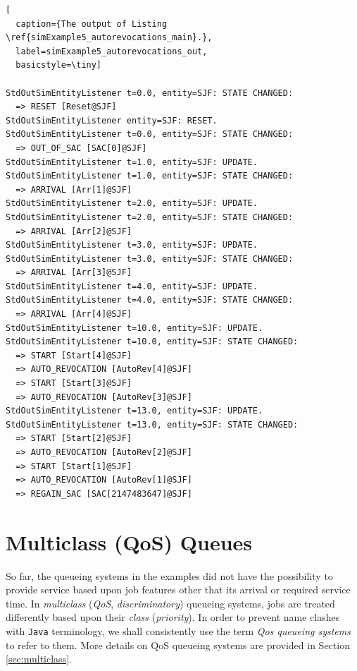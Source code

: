 \documentclass[12pt]{book}
\begin{document}
\begin{lstfloat}  
\begin{lstlisting}[
  caption={The output of Listing \ref{simExample5_autorevocations_main}.},
  label=simExample5_autorevocations_out,
  basicstyle=\tiny]

StdOutSimEntityListener t=0.0, entity=SJF: STATE CHANGED:
  => RESET [Reset@SJF]
StdOutSimEntityListener entity=SJF: RESET.
StdOutSimEntityListener t=0.0, entity=SJF: STATE CHANGED:
  => OUT_OF_SAC [SAC[0]@SJF]
StdOutSimEntityListener t=1.0, entity=SJF: UPDATE.
StdOutSimEntityListener t=1.0, entity=SJF: STATE CHANGED:
  => ARRIVAL [Arr[1]@SJF]
StdOutSimEntityListener t=2.0, entity=SJF: UPDATE.
StdOutSimEntityListener t=2.0, entity=SJF: STATE CHANGED:
  => ARRIVAL [Arr[2]@SJF]
StdOutSimEntityListener t=3.0, entity=SJF: UPDATE.
StdOutSimEntityListener t=3.0, entity=SJF: STATE CHANGED:
  => ARRIVAL [Arr[3]@SJF]
StdOutSimEntityListener t=4.0, entity=SJF: UPDATE.
StdOutSimEntityListener t=4.0, entity=SJF: STATE CHANGED:
  => ARRIVAL [Arr[4]@SJF]
StdOutSimEntityListener t=10.0, entity=SJF: UPDATE.
StdOutSimEntityListener t=10.0, entity=SJF: STATE CHANGED:
  => START [Start[4]@SJF]
  => AUTO_REVOCATION [AutoRev[4]@SJF]
  => START [Start[3]@SJF]
  => AUTO_REVOCATION [AutoRev[3]@SJF]
StdOutSimEntityListener t=13.0, entity=SJF: UPDATE.
StdOutSimEntityListener t=13.0, entity=SJF: STATE CHANGED:
  => START [Start[2]@SJF]
  => AUTO_REVOCATION [AutoRev[2]@SJF]
  => START [Start[1]@SJF]
  => AUTO_REVOCATION [AutoRev[1]@SJF]
  => REGAIN_SAC [SAC[2147483647]@SJF]

\end{lstlisting}
\end{lstfloat}

\section{Multiclass (QoS) Queues}
\label{sec:guided:qos}

So far,
  the queueing systems in the examples did not
  have the possibility to provide service based
  upon job features other that its arrival
  or required service time.
In {\em multiclass\/} ({\em QoS}, {\em discriminatory\/})
  queueing systems,
  jobs are treated differently based upon their {\em class\/}
  ({\em priority\/}).
In order to prevent name clashes with \lstinline|Java|
  terminology, we shall consistently use the term
  {\em Qos queueing systems\/} to refer to them.
More details on QoS queueing systems are provided
  in Section \ref{sec:multiclass}.
\end{document}

